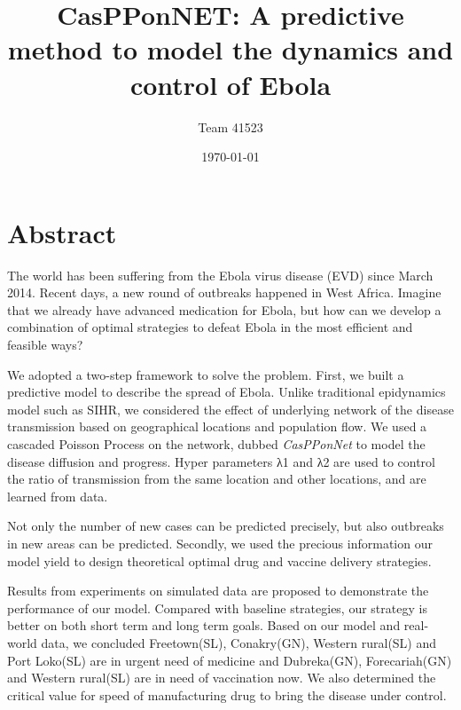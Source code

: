 \documentclass[11pt]{article}
\title{CasPPonNET: A predictive method to model the dynamics and control of Ebola }
\author{Team 41523}
\date{\today}
\begin{document}
	\maketitle
	
\section*{Abstract}
The world has been suffering from the Ebola virus disease (EVD) since March 2014. Recent days, a new round of outbreaks happened in West Africa. Imagine that we already have advanced medication for Ebola, but how can we develop a combination of optimal strategies to defeat Ebola in the most efficient and feasible ways?

We adopted a two-step framework to solve the problem. First, we built a predictive model to describe the spread of Ebola. Unlike traditional epidynamics model such as SIHR, we considered the effect of underlying network of the disease transmission based on geographical locations and population flow. We used a cascaded Poisson Process on the network, dubbed \emph{CasPPonNet} to model the disease diffusion and progress. Hyper parameters λ1 and λ2 are used to control the ratio of transmission from the same location and other locations, and are learned from data.

Not only the number of new cases can be predicted precisely, but also outbreaks in new areas can be predicted. Secondly, we used the precious information our model yield to design theoretical optimal drug and vaccine delivery strategies. 

Results from experiments on simulated data are proposed to demonstrate the performance of our model. Compared with baseline strategies, our strategy is better on both short term and long term goals. Based on our model and real-world data, we concluded Freetown(SL), Conakry(GN), Western rural(SL) and Port Loko(SL) are in urgent need of medicine and Dubreka(GN), Forecariah(GN) and Western rural(SL) are in need of vaccination now. We also determined the critical value for speed of manufacturing drug to bring the disease under control.
\end{document}
